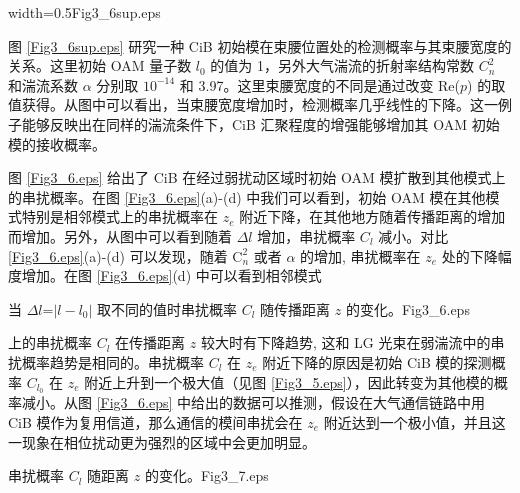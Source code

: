 \documentclass[master]{thesis-uestc}
\begin{document}
 {width=0.5\textwidth}{Fig3_6sup.eps}

图 \ref{Fig3_6sup.eps} 研究一种 CiB 初始模在束腰位置处的检测概率与其束腰宽度的关系。这里初始 OAM 量子数 $l_0$ 的值为 1，另外大气湍流的折射率结构常数 $C_n^{2}$ 和湍流系数 $\alpha$ 分别取 $10^{-14}$ 和 3.97。这里束腰宽度的不同是通过改变 Re($p$) 的取值获得。从图中可以看出，当束腰宽度增加时，检测概率几乎线性的下降。这一例子能够反映出在同样的湍流条件下，CiB 汇聚程度的增强能够增加其 OAM 初始模的接收概率。

图 \ref{Fig3_6.eps} 给出了 CiB 在经过弱扰动区域时初始 OAM 模扩散到其他模式上的串扰概率。在图 \ref{Fig3_6.eps}(a)-(d) 中我们可以看到，初始 OAM 模在其他模式特别是相邻模式上的串扰概率在 $z_e$ 附近下降，在其他地方随着传播距离的增加而增加。另外，从图中可以看到随着 $\Delta l$ 增加，串扰概率 $C_l$ 减小。对比 \ref{Fig3_6.eps}(a)-(d) 可以发现，随着 $\mathrm{C}^2_n$ 或者 $\alpha$ 的增加, 串扰概率在 $z_e$ 处的下降幅度增加。在图 \ref{Fig3_6.eps}(d) 中可以看到相邻模式 \linebreak[4]

\begin{pics}[H]{当 $\Delta$$l$=$|l-l_0|$ 取不同的值时串扰概率 $C_{l}$ 随传播距离 $z$ 的变化。}{Fig3_6.eps}
\end{pics}

\noindent 上的串扰概率 $C_l$ 在传播距离 $z$ 较大时有下降趋势, 这和 LG 光束在弱湍流中的串扰概率趋势是相同的\citeup{}。串扰概率 $C_l$ 在 $z_e$ 附近下降的原因是初始 CiB 模的探测概率 $C_{l_0}$ 在 $z_e$ 附近上升到一个极大值（见图 \ref{Fig3_5.eps}），因此转变为其他模的概率减小。从图 \ref{Fig3_6.eps} 中给出的数据可以推测，假设在大气通信链路中用 CiB 模作为复用信道，那么通信的模间串扰会在 $z_e$ 附近达到一个极小值，并且这一现象在相位扰动更为强烈的区域中会更加明显。

\begin{pics}[H]{串扰概率 $C_l$ 随距离 $z$ 的变化。}{Fig3_7.eps}
\end{pics}
\end{document}
